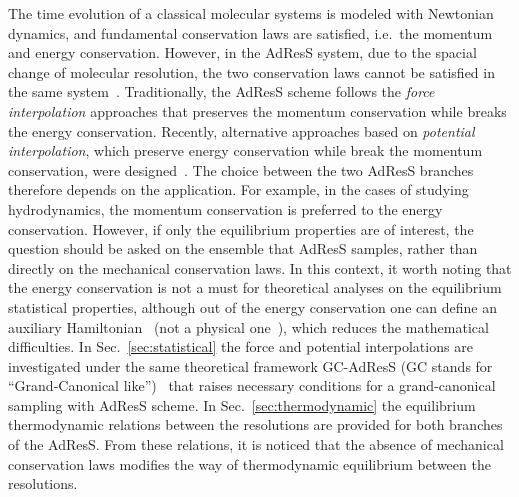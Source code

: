 \documentclass[epjST]{svjour}
\begin{document}
The time evolution of a classical molecular systems
is modeled with Newtonian dynamics, and fundamental conservation laws
are satisfied, i.e.~the momentum and energy conservation.
However, in the AdResS system,
due to the spacial change of molecular resolution,
the two conservation laws cannot be satisfied in the same system~\cite{praprotnik2011comment,dellesite2007some}.
Traditionally, the AdResS scheme follows the \emph{force interpolation} approaches
that preserves the momentum conservation while breaks the energy
conservation.
Recently,
alternative approaches based on \emph{potential interpolation},
which preserve energy conservation while break the momentum conservation,
were designed~\cite{wang2013grand,potestio2013hamiltonian}.
The choice between the two AdResS branches therefore depends on the application. For example, in the
cases of studying hydrodynamics, the momentum conservation is preferred to the energy conservation.
However, if only the equilibrium properties are of interest,
the question should be asked on the ensemble that AdResS samples,
rather than directly on the mechanical conservation laws.
In this context,
it worth noting that the energy conservation is not a must for theoretical analyses on the equilibrium statistical properties,
although out of the energy conservation
one can define an auxiliary Hamiltonian~\cite{wang2013grand,agarwal2014chemical}
(not a physical one~\cite{dellesite2013multiscale}),
which reduces the mathematical difficulties.
In Sec.~\ref{sec:statistical} the force and potential interpolations are investigated 
under the same theoretical framework GC-AdResS (GC stands for ``Grand-Canonical like'')~\cite{wang2013grand} that raises necessary conditions
for a grand-canonical sampling with AdResS scheme.
In Sec.~\ref{sec:thermodynamic} the equilibrium thermodynamic relations between the resolutions are
provided for both branches of the AdResS.
From these relations, it is noticed that the absence of mechanical conservation laws 
modifies the way of thermodynamic equilibrium between the resolutions.
\end{document}
